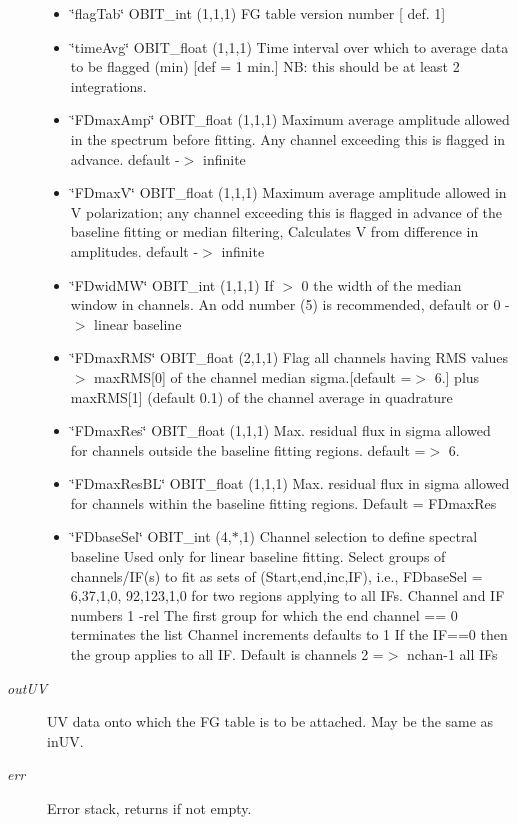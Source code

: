 \begin{Desc}
\begin{description}
\begin{itemize}
\item \char`\"{}flag\-Tab\char`\"{} OBIT\_\-int (1,1,1) FG table version number [ def. 1] \item \char`\"{}time\-Avg\char`\"{} OBIT\_\-float (1,1,1) Time interval over which to average data to be flagged (min) [def = 1 min.] NB: this should be at least 2 integrations. \item \char`\"{}FDmax\-Amp\char`\"{} OBIT\_\-float (1,1,1) Maximum average amplitude allowed in the spectrum before fitting. Any channel exceeding this is flagged in advance. default -$>$ infinite \item \char`\"{}FDmax\-V\char`\"{} OBIT\_\-float (1,1,1) Maximum average amplitude allowed in V polarization; any channel exceeding this is flagged in advance of the baseline fitting or median filtering, Calculates V from difference in amplitudes. default -$>$ infinite \item \char`\"{}FDwid\-MW\char`\"{} OBIT\_\-int (1,1,1) If $>$ 0 the width of the median window in channels. An odd number (5) is recommended, default or 0 -$>$ linear baseline \item \char`\"{}FDmax\-RMS\char`\"{} OBIT\_\-float (2,1,1) Flag all channels having RMS values $>$ max\-RMS[0] of the channel median sigma.[default =$>$ 6.] plus max\-RMS[1] (default 0.1) of the channel average in quadrature \item \char`\"{}FDmax\-Res\char`\"{} OBIT\_\-float (1,1,1) Max. residual flux in sigma allowed for channels outside the baseline fitting regions. default =$>$ 6. \item \char`\"{}FDmax\-Res\-BL\char`\"{} OBIT\_\-float (1,1,1) Max. residual flux in sigma allowed for channels within the baseline fitting regions. Default = FDmax\-Res \item \char`\"{}FDbase\-Sel\char`\"{} OBIT\_\-int (4,$\ast$,1) Channel selection to define spectral baseline Used only for linear baseline fitting. Select groups of channels/IF(s) to fit as sets of (Start,end,inc,IF), i.e., FDbase\-Sel = 6,37,1,0, 92,123,1,0 for two regions applying to all IFs. Channel and IF numbers 1 -rel The first group for which the end channel == 0 terminates the list Channel increments defaults to 1 If the IF==0 then the group applies to all IF. Default is channels 2 =$>$ nchan-1 all IFs \end{itemize}
\item[{\em out\-UV}]UV data onto which the FG table is to be attached. May be the same as in\-UV. \item[{\em err}]Error stack, returns if not empty. \end{description}
\end{Desc}
